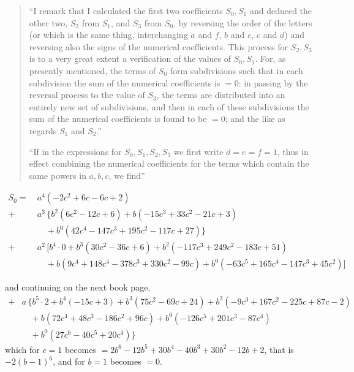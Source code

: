 \documentclass[11pt]{article}
\begin{document}
\begin{quote}
``I remark that I calculated the first two coefficients $S_0, S_1$ and deduced the other two, $S_2$ from $S_1$, and $S_3$ from $S_0$, by reversing the order of the letters (or which is the same thing, interchanging $a$ and $f$, $b$ and $e$, $c$ and $d$) and reversing also the signs of the numerical coefficients. This process for $S_2, S_3$ is to a very great extent a verification of the values of $S_0, S_1$. For, as presently mentioned, the terms of $S_0$ form subdivisions such that in each subdivision the sum of the numerical coefficients is $=0$: in passing by the reversal process to the value of $S_3$, the terms are distributed into an entirely new set of subdivisions, and then in each of these subdivisions the sum of the numerical coefficients is found to be $=0$; and the like as regards $S_1$ and $S_2$.''

\smallskip

``If in the expressions for $S_0, S_1, S_2, S_3$ we first write $d=e=f=1$, thus in effect combining the numerical coefficients for the terms which contain the same powers in $a, b, c$, we find''
\end{quote}

\medskip

\begin{align*}
S_0 = \ {}& a^4 (-2c^2 + 6c - 6c + 2) \\
{}+{}& a^3\,\{ b^2 (6c^2 - 12c + 6) + b (-15c^3 + 33c^2 - 21c + 3) \\
       &\quad + b^0 (42c^4 - 147c^3 + 195c^2 - 117c + 27) \} \\
{}+{}& a^2\,[ b^4 \cdot 0 + b^3 (30c^2 - 36c + 6) + b^2 (-117c^3 + 249c^2 - 183c + 51) \\
       &\quad + b (9c^4 + 148c^4 - 378c^3 + 330c^2 - 99c) + b^0 (-63c^5 + 165c^4 - 147c^3 + 45c^2) ]
\end{align*}

\medskip

\noindent and continuing on the next book page,
\begin{align*}
{}+{}& a\,\{b^5 \cdot 2 + b^4 (-15c + 3) + b^3 (75c^2 - 69c + 24) + b^2 (-9c^3 + 167c^2 - 225c + 87c - 2) \\
        &\quad + b (72c^4 + 48c^3 - 186c^2 + 96c) + b^0 (-126c^5 + 201c^3 - 87c^4) \\
        &\quad + b^0 (27c^6 - 40c^5 + 20c^4) \}
\end{align*}
which for $c=1$ becomes $= 2b^6 - 12b^5 + 30b^4 - 40b^3 + 30b^2 - 12b + 2$, that is $-2(b-1)^6$, and for $b=1$ becomes $=0$.
\end{document}
